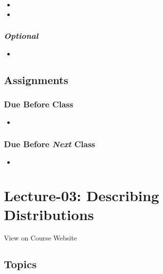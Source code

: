 \documentclass[]{book}
\theoremstyle{definition}
\theoremstyle{definition}
\theoremstyle{definition}
\theoremstyle{remark}
\begin{document}
\begin{itemize}
\item
\item
\end{itemize}

\subsubsection*{\texorpdfstring{\emph{Optional}}{Optional}}\label{optional-2}

\begin{itemize}
\item
\end{itemize}

\subsection*{Assignments}\label{assignments-3}

\subsubsection*{Due Before Class}\label{due-before-class-1}

\begin{itemize}
\item
\end{itemize}

\subsubsection*{\texorpdfstring{Due Before \emph{Next}
Class}{Due Before Next Class}}\label{due-before-next-class-2}

\begin{itemize}
\item
\end{itemize}

\section{Lecture-03: Describing
Distributions}\label{lecture-03-describing-distributions}

View on Course Website

\subsection*{Topics}\label{topics-3}
\end{document}
